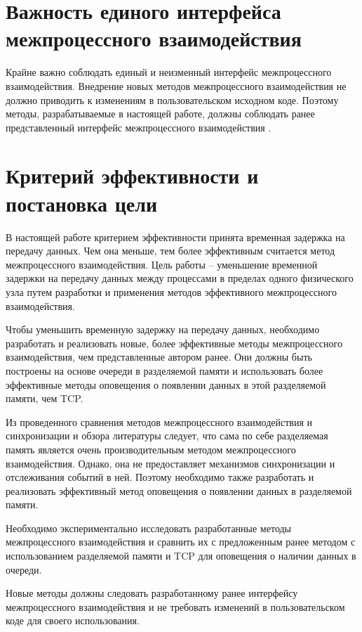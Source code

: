 \section{Важность единого интерфейса межпроцессного взаимодействия}

Крайне важно соблюдать единый и неизменный интерфейс межпроцессного взаимодействия. Внедрение новых методов межпроцессного взаимодействия не должно приводить к изменениям в пользовательском исходном коде. Поэтому методы, разрабатываемые в настоящей работе, должны соблюдать ранее представленный интерфейс межпроцессного взаимодействия \cite{GubarevKMU18}.

\finishrelatedwork

\section{Критерий эффективности и постановка цели}

В настоящей работе критерием эффективности принята временная задержка на передачу данных. Чем она меньше, тем более эффективным считается метод межпроцессного взаимодействия.
Цель работы -- уменьшение временной задержки на передачу данных между процессами в пределах одного физического узла путем разработки и применения методов эффективного межпроцессного взаимодействия.

Чтобы уменьшить временную задержку на передачу данных, необходимо разработать и реализовать новые, более эффективные методы межпроцессного взаимодействия, чем представленные автором ранее. Они должны быть построены на основе очереди в разделяемой памяти и использовать более эффективные методы оповещения о появлении данных в этой разделяемой памяти, чем TCP.

Из проведенного сравнения методов межпроцессного взаимодействия и синхронизации и обзора литературы следует, что сама по себе разделяемая память является очень производительным методом межпроцессного взаимодействия. Однако, она не предоставляет механизмов синхронизации и отслеживания событий в ней. Поэтому необходимо также разработать и реализовать эффективный метод оповещения о появлении данных в разделяемой памяти.

Необходимо экспериментально исследовать разработанные методы межпроцессного взаимодействия и сравнить их с предложенным ранее методом с использованием разделяемой памяти и TCP для оповещения о наличии данных в очереди.

Новые методы должны следовать разработанному ранее интерфейсу межпроцессного взаимодействия и не требовать изменений в пользовательском коде для своего использования.
